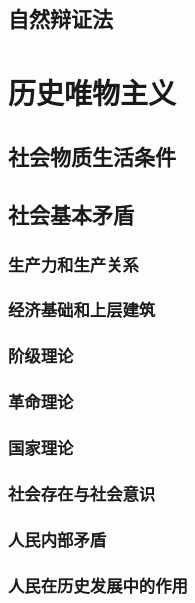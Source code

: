 \documentclass[UTF8]{../RepresentationUniverse}
\begin{document}
\subsection{自然辩证法}





\section{历史唯物主义}

\subsection{社会物质生活条件}

\subsection{社会基本矛盾}
    \subsubsection{生产力和生产关系}
    \subsubsection{经济基础和上层建筑}

\subsubsection{阶级理论}
\subsubsection{革命理论}
\subsubsection{国家理论}
\subsubsection{社会存在与社会意识}
\subsubsection{人民内部矛盾}
\subsubsection{人民在历史发展中的作用}
\end{document}
